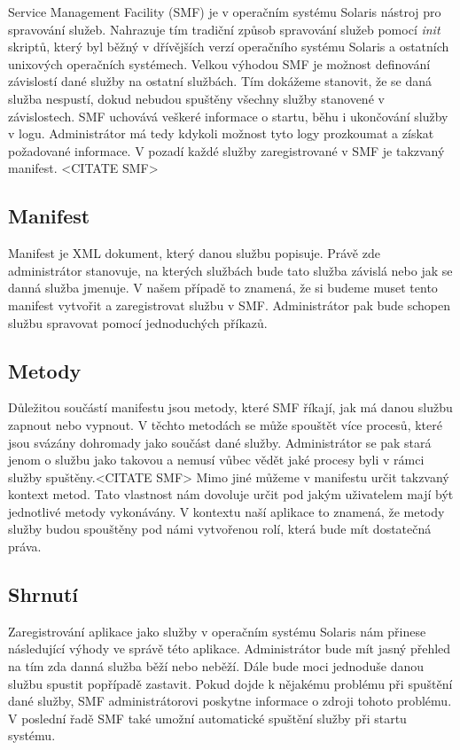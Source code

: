 Service Management Facility (SMF) je v operačním systému Solaris nástroj pro spravování služeb. Nahrazuje tím tradiční způsob spravování služeb pomocí \emph{init} skriptů, který byl běžný v dřívějších verzí operačního systému Solaris a ostatních unixových operačních systémech. Velkou výhodou SMF je možnost definování závislostí dané služby na ostatní službách. Tím dokážeme stanovit, že se daná služba nespustí, dokud nebudou spuštěny všechny služby stanovené v závislostech. SMF uchovává veškeré informace o startu, běhu i ukončování služby v logu. Administrátor má tedy kdykoli možnost tyto logy prozkoumat a získat požadované informace. V pozadí každé služby zaregistrované v SMF je takzvaný manifest. <CITATE SMF>
    \subsection{Manifest}
    Manifest je XML dokument, který danou službu popisuje. Právě zde administrátor stanovuje, na kterých službách bude tato služba závislá nebo jak se danná služba jmenuje. V našem případě to znamená, že si budeme muset tento manifest vytvořit a zaregistrovat službu v SMF. Administrátor pak bude schopen službu spravovat pomocí jednoduchých příkazů.
    \subsection{Metody}
    Důležitou součástí manifestu jsou metody, které SMF říkají, jak má danou službu zapnout nebo vypnout. V těchto metodách se může spouštět více procesů, které jsou svázány dohromady jako součást dané služby. Administrátor se pak stará jenom o službu jako takovou a nemusí vůbec vědět jaké procesy byli v rámci služby spuštěny.<CITATE SMF> Mimo jiné můžeme v manifestu určit takzvaný kontext metod. Tato vlastnost nám dovoluje určit pod jakým uživatelem mají být jednotlivé metody vykonávány. V kontextu naší aplikace to znamená, že metody služby budou spouštěny pod námi vytvořenou rolí, která bude mít dostatečná práva.
    \subsection{Shrnutí}
    Zaregistrování aplikace jako služby v operačním systému Solaris nám přinese následující výhody ve správě této aplikace. Administrátor bude mít jasný přehled na tím zda danná služba běží nebo neběží. Dále bude moci jednoduše danou službu spustit popřípadě zastavit. Pokud dojde k nějakému problému při spuštění dané služby, SMF administrátorovi poskytne informace o zdroji tohoto problému. V poslední řadě SMF také umožní automatické spuštění služby při startu systému.


